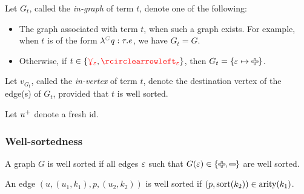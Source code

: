 Let $G_t$, called the \emph{in-graph} of term $t$, denote one of the following:
\begin{itemize}
  \item
    The graph associated with term $t$, when such a graph exists.
    For example, when $t$ is of the form $\eFun{G}{q}{\tau}{e}$, we have $G_t = G$.
  \item
    Otherwise,
    if $t \in \SetOf{\multiVertex{\e}, \cycleVertex{\e}}$,
    then $G_t = \SetOf{\e \mapsto \Plus}$.
\end{itemize}

Let $v_{G_t}$, called the \emph{in-vertex} of term $t$,
denote the destination vertex of the edge(s) of $G_t$,
provided that $t$ is well sorted.

Let ${u}^{+}$ denote a fresh id.


\subsubsection{Well-sortedness}

\begin{definition}
  A graph $G$ is well sorted if all edges $\varepsilon$ such that $G(\e) \in \{\Plus, \Minus\}$ are well sorted.
\end{definition}

\begin{definition}
  An edge $(u, (u_1, k_1), p, (u_2, k_2))$ is well sorted if $(p, \operatorname{\text{sort}}\mathopen{}\left(k_2\right)\mathclose{}) \in \operatorname{\text{arity}}\mathopen{}\left(k_1\right)\mathclose{}$.
\end{definition}

